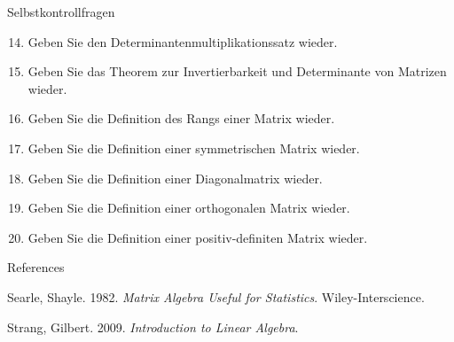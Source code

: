 \documentclass[
  8pt,
  ignorenonframetext,
]{beamer}
\newlength{\cslhangindent}
\newlength{\cslentryspacingunit} %
\newenvironment{CSLReferences}[2] %
 {%
  \setlength{\parindent}{0pt}
  \ifodd #1
  \let\oldpar\par
  \def\par{\hangindent=\cslhangindent\oldpar}
  \fi
  \setlength{\parskip}{#2\cslentryspacingunit}
 }%
 {}
\begin{document}
\begin{frame}{Selbstkontrollfragen}
\protect\hypertarget{selbstkontrollfragen-2}{}
\footnotesize
{}
\begin{enumerate}
\setcounter{enumi}{13}
\item Geben Sie den Determinantenmultiplikationssatz wieder.
\item Geben Sie das Theorem zur Invertierbarkeit und Determinante von Matrizen wieder.
\item Geben Sie die Definition des Rangs einer Matrix wieder.
\item Geben Sie die Definition einer symmetrischen Matrix wieder.
\item Geben Sie die Definition einer Diagonalmatrix wieder.
\item Geben Sie die Definition einer orthogonalen Matrix wieder.
\item Geben Sie die Definition einer positiv-definiten Matrix wieder.
\end{enumerate}
\end{frame}

\begin{frame}{References}
\protect\hypertarget{references}{}
\footnotesize

\hypertarget{refs}{}
\begin{CSLReferences}{1}{0}
\leavevmode{}%
Searle, Shayle. 1982. \emph{Matrix {Algebra Useful} for {Statistics}}.
{Wiley-Interscience}.

\leavevmode{}%
Strang, Gilbert. 2009. \emph{Introduction to {Linear Algebra}}.

\end{CSLReferences}
\end{frame}
\end{document}
